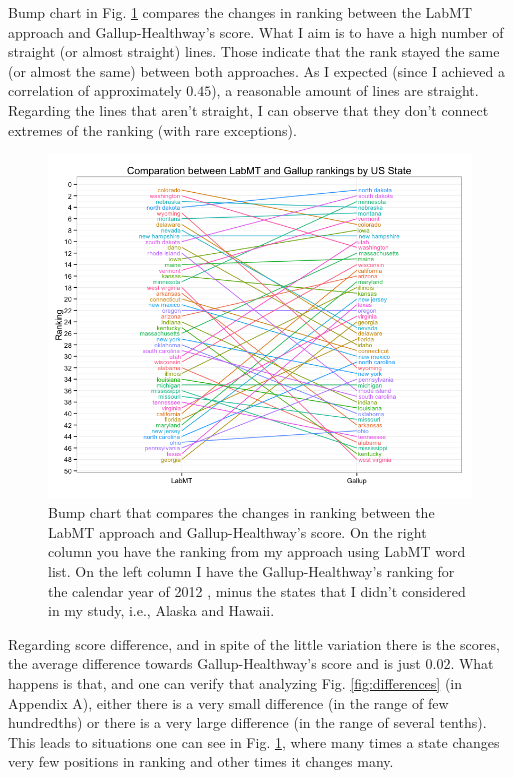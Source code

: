 \documentclass{llncs}
\begin{document}
Bump chart in Fig. \ref{fig:bump_chart} compares the changes in ranking between the LabMT approach and Gallup-Healthway's score. What I aim is to have a high number of straight (or almost straight) lines. Those indicate that the rank stayed the same (or almost the same) between both approaches. As I expected (since I achieved a correlation of approximately $0.45$), a reasonable amount of lines are straight. Regarding the lines that aren't straight, I can observe that they don't connect extremes of the ranking (with rare exceptions).


\begin{figure}
\centering
\includegraphics[width=\textwidth]{images/bump_chart}
\caption{Bump chart that compares the changes in ranking between the LabMT approach and Gallup-Healthway's score. On the right column you have the ranking from my approach using LabMT word list. On the left column I have the Gallup-Healthway's ranking for the calendar year of 2012 \cite{GallupHealthway2013}, minus the states that I didn't considered in my study, i.e., Alaska and Hawaii.}
\label{fig:bump_chart}
\end{figure}


Regarding score difference, and in spite of the little variation there is the scores, the average difference towards Gallup-Healthway's score and is just $0.02$. What happens is that, and one can verify that analyzing Fig. \ref{fig:differences} (in Appendix A), either there is a very small difference (in the range of few hundredths) or there is a very large difference (in the range of several tenths). This leads to situations one can see in Fig. \ref{fig:bump_chart}, where many times a state changes very few positions in ranking and other times it changes many.
\end{document}
